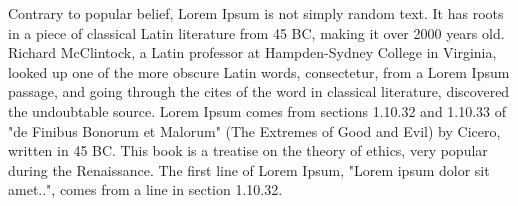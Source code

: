\documentclass[12pt,letterpaper]{article} %
\begin{document}
Contrary to popular belief, Lorem Ipsum is not simply random text. It has roots in a piece of classical Latin literature from 45 BC, making it over 2000 years old. Richard McClintock, a Latin professor at Hampden-Sydney College in Virginia, looked up one of the more obscure Latin words, consectetur, from a Lorem Ipsum passage, and going through the cites of the word in classical literature, discovered the undoubtable source. Lorem Ipsum comes from sections 1.10.32 and 1.10.33 of "de Finibus Bonorum et Malorum" (The Extremes of Good and Evil) by Cicero, written in 45 BC. This book is a treatise on the theory of ethics, very popular during the Renaissance. The first line of Lorem Ipsum, "Lorem ipsum dolor sit amet..", comes from a line in section 1.10.32.
\end{document}
